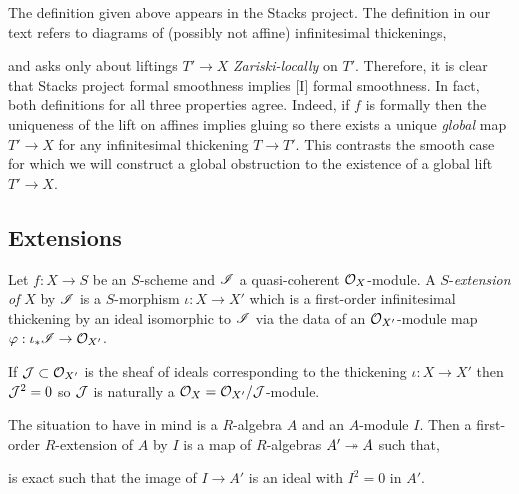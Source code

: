 \documentclass[12pt]{article}
\begin{document}
\begin{rmk}
The definition given above appears in the Stacks project. The definition in our text refers to diagrams of (possibly not affine) infinitesimal thickenings,
\begin{center}
\end{center}
and asks only about liftings $T' \to X$ \textit{Zariski-locally} on $T'$. Therefore, it is clear that Stacks project formal smoothness implies [I] formal smoothness. In fact, both definitions for all three properties agree. Indeed, if $f$ is formally \etale then the uniqueness of the lift on affines implies gluing so there exists a unique \textit{global} map $T' \to X$ for any infinitesimal thickening $T \to T'$. This contrasts the smooth case for which we will construct a global obstruction to the existence of a global lift $T' \to X$.
\end{rmk}

\subsection{Extensions}

\begin{defn}
Let $f : X \to S$ be an $S$-scheme and $\mathscr{I}$ a quasi-coherent $\mathcal{O}_{X}$-module. A $S$-\textit{extension of} $X$ by $\mathscr{I}$ is a $S$-morphism $\iota : X \to X'$ which is a first-order infinitesimal thickening by an ideal isomorphic to $\mathscr{I}$ via the data of an $\mathcal{O}_{X'}$-module map $\varphi : \iota_* \mathscr{I} \to \mathcal{O}_{X'}$.
\end{defn}

\begin{rmk}
If $\mathcal{J} \subset \mathcal{O}_{X'}$ is the sheaf of ideals corresponding to the thickening $\iota : X \to X'$ then $\mathcal{J}^2 = 0$ so $\mathcal{J}$ is naturally a $\mathcal{O}_{X} = \mathcal{O}_{X'}/\mathcal{J}$-module.
\end{rmk}

\begin{rmk}
The situation to have in mind is a $R$-algebra $A$ and an $A$-module $I$. Then a first-order $R$-extension of $A$ by $I$ is a map of $R$-algebras $A' \twoheadrightarrow A$ such that,
\begin{center}
\end{center}
is exact such that the image of $I \to A'$ is an ideal with $I^2 = 0$ in $A'$.
\end{rmk}
\end{document}
